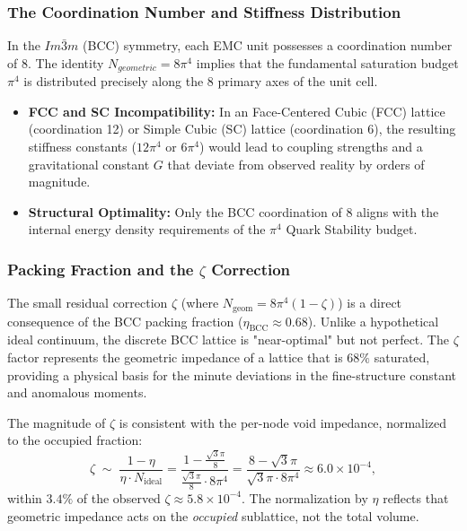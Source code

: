 \documentclass[10pt,a4paper]{article}
\begin{document}
\subsubsection{The Coordination Number and Stiffness Distribution}
\label{subsub:coordination}
In the $Im\bar{3}m$ (BCC) symmetry, each EMC unit possesses a coordination number of 8. The identity $N_{geometric} = 8\pi^4$ implies that the fundamental saturation budget $\pi^4$ is distributed precisely along the 8 primary axes of the unit cell. 
\begin{itemize}
	\item \textbf{FCC and SC Incompatibility:} In an Face-Centered Cubic (FCC) lattice (coordination 12) or Simple Cubic (SC) lattice (coordination 6), the resulting stiffness constants ($12\pi^4$ or $6\pi^4$) would lead to coupling strengths and a gravitational constant $G$ that deviate from observed reality by orders of magnitude. 
	\item \textbf{Structural Optimality:} Only the BCC coordination of 8 aligns with the internal energy density requirements of the $\pi^4$ Quark Stability budget.
\end{itemize}

\subsubsection{Packing Fraction and the $\zeta$ Correction}
\label{subsub:packing_fraction}
The small residual correction $\zeta$ (where $N_{\text{geom}} = 8\pi^4(1-\zeta)$) is a direct consequence of the BCC packing fraction ($\eta_{\text{BCC}} \approx 0.68$). Unlike a hypothetical ideal continuum, the discrete BCC lattice is "near-optimal" but not perfect. The $\zeta$ factor represents the geometric impedance of a lattice that is $68\%$ saturated, providing a physical basis for the minute deviations in the fine-structure constant and anomalous moments.

The magnitude of $\zeta$ is consistent with the per-node 
void impedance, normalized to the occupied fraction:
\begin{equation}
	\zeta \;\sim\; \frac{1-\eta}{\eta \cdot N_{\text{ideal}}} 
	= \frac{1 - \frac{\sqrt{3}\pi}{8}}{\frac{\sqrt{3}\pi}{8} 
		\cdot 8\pi^4} 
	= \frac{8 - \sqrt{3}\pi}{\sqrt{3}\pi \cdot 8\pi^4}
	\approx 6.0 \times 10^{-4},
\end{equation}
within $3.4\%$ of the observed $\zeta \approx 5.8 \times 10^{-4}$.
The normalization by $\eta$ reflects that geometric impedance 
acts on the \emph{occupied} sublattice, not the total volume.
\end{document}
